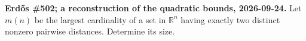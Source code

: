 \textbf{Erd\H{o}s \#502; a reconstruction of the quadratic bounds, 2026-09-24.}
Let $m(n)$ be the largest cardinality of a set in $\mathbb R^n$ having exactly two distinct nonzero pairwise distances. Determine its size.
